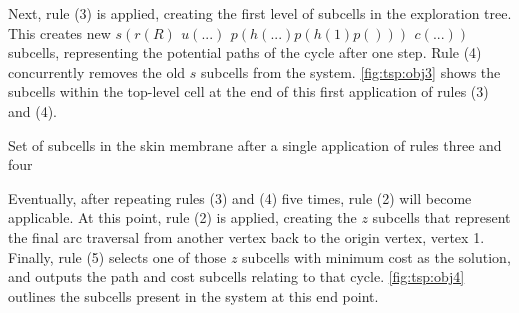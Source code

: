 Next, rule (3) is applied, creating the first level of subcells in the exploration tree.  This creates new \(s(r(R) ~ \,u(...) ~ \,p(h(...)p(h(1)p())) ~ \,c(...))\) subcells, representing the potential paths of the cycle after one step.  Rule (4) concurrently removes the old \(s\) subcells from the system.  \autoref{fig:tsp:obj3} shows the subcells within the top-level cell at the end of this first application of rules (3) and (4).


\begin{cpobjectsfloat}
\begin{cpobjects}
\end{cpobjects}
\caption{\label{fig:tsp:obj3}Set of subcells in the skin membrane after a single application of rules three and four}
\end{cpobjectsfloat}

Eventually, after repeating rules (3) and (4) five times, rule (2) will become applicable.  At this point, rule (2) is applied, creating the \(z\) subcells that represent the final arc traversal from another vertex back to the origin vertex, vertex 1.  Finally, rule (5) selects one of those \(z\) subcells with minimum cost as the solution, and outputs the path and cost subcells relating to that cycle.  \autoref{fig:tsp:obj4} outlines the subcells present in the system at this end point.

